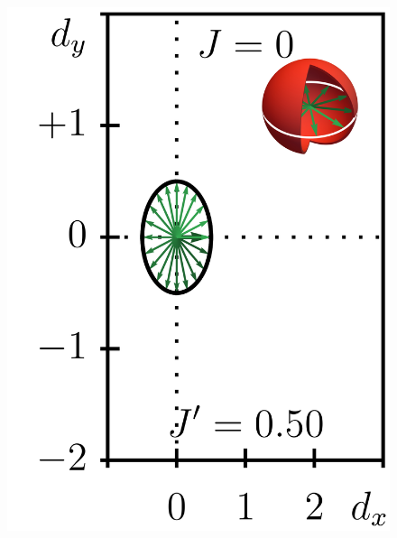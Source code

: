 \begin{figure}[ht]
    \centering
    \includegraphics{figures/ssh_unnormalized_winding_2.png}

\end{figure}
